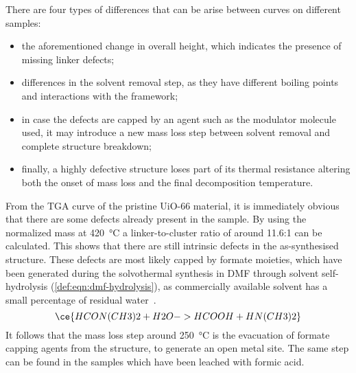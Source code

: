 There are four types of differences that can be arise 
between curves on different samples:

\begin{itemize}
    \item the aforementioned change in overall height,
    which indicates the presence of missing linker defects;
    \item differences in the solvent removal step, as they
    have different boiling points and interactions with the 
    framework;
    \item in case the defects are capped by an agent such as 
    the modulator molecule used, it may introduce a new 
    mass loss step between solvent removal and complete
    structure breakdown;
    \item finally, a highly defective structure loses part 
    of its thermal resistance altering both the onset of mass
    loss and the final decomposition temperature.
\end{itemize}

From the TGA curve of the pristine UiO-66 material, 
it is immediately obvious that there are some defects 
already present in the sample. By using the normalized
mass at \SI{420}{\degreeCelsius} a linker-to-cluster 
ratio of around 11.6:1 can be calculated. This shows that
there are still intrinsic defects in the as-synthesised 
structure. These defects are most likely capped by 
formate moieties, which have been generated during 
the solvothermal synthesis in DMF through solvent 
self-hydrolysis (\autoref{def:eqn:dmf-hydrolysis}), as 
commercially available solvent has a small percentage of 
residual water~\cite{shearerDefectEngineeringTuning2016}.
%
\begin{equation}\label{def:eqn:dmf-hydrolysis}
    \ce{HCON(CH3)2 + H2O -> HCOOH + HN(CH3)2}
\end{equation}
%
It follows that the mass loss step around \SI{250}{\degreeCelsius}
is the evacuation of formate capping agents from the 
structure, to generate an open metal site. The same step
can be found in the samples which have been leached with
formic acid.

